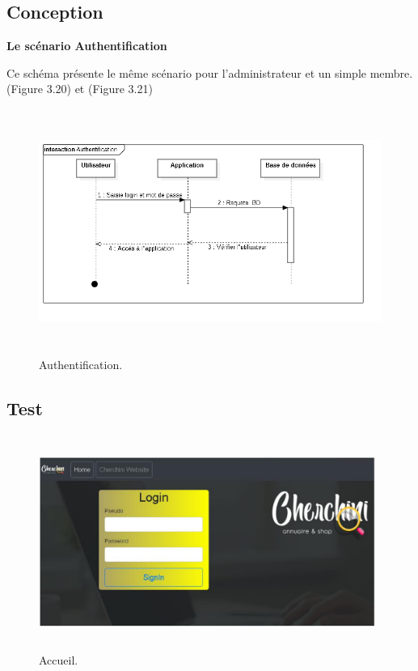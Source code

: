 
\subsection{Conception}
\textbf{Le sc\'{e}nario \guillemotleft{} Authentification \guillemotright{}}

Ce sch\'{e}ma pr\'{e}sente le m\^{e}me sc\'{e}nario pour l'administrateur et un simple
membre.(Figure 3.20) et (Figure 3.21)

\begin{figure}[H]
\center
\includegraphics[width=14cm,height=8cm]{./figures/seq/A.png}
\caption{Authentification.}
\end{figure}


\subsection{Test}


\begin{figure}[H]
\center
\includegraphics[width=11cm,height=7cm]{./figures/pres/1.png}
\caption{Accueil.}

\end{figure}
